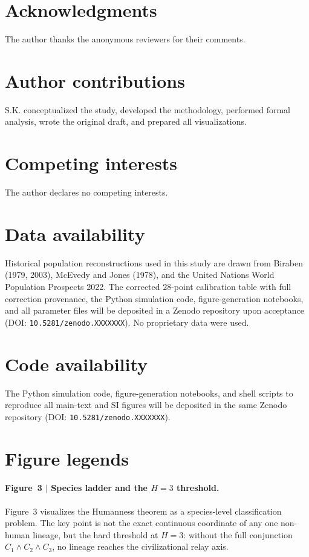 \documentclass[11pt]{article}
\begin{document}
\section*{Acknowledgments}
The author thanks the anonymous reviewers for their comments.




\section*{Author contributions}
S.K. conceptualized the study,
developed the methodology,
performed formal analysis,
wrote the original draft,
and prepared all visualizations.

\section*{Competing interests}
The author declares no competing interests.

\section*{Data availability}
Historical population reconstructions used in this study are drawn from Biraben (1979, 2003),
McEvedy and Jones (1978),
and the United Nations World Population Prospects 2022.
The corrected 28-point calibration table with full correction provenance,
the Python simulation code,
figure-generation notebooks,
and all parameter files will be deposited in a Zenodo repository upon acceptance
(DOI:
\texttt{10.5281/zenodo.XXXXXXX}).
No proprietary data were used.

\section*{Code availability}
The Python simulation code,
figure-generation notebooks,
and shell scripts to reproduce all main-text and SI figures will be deposited in the same Zenodo repository
(DOI:
\texttt{10.5281/zenodo.XXXXXXX}).

\section*{Figure legends}

\paragraph{Figure~3 $\vert$ Species ladder and the \(H{=}3\) threshold.}
Figure~3 visualizes the Humanness theorem as a species-level classification problem.
The key point is not the exact continuous coordinate of any one non-human lineage,
but the hard threshold at
\(H{=}3\):
without the full conjunction
\(C_1\wedge C_2\wedge C_3\),
no lineage reaches the civilizational relay axis.
\end{document}
